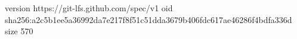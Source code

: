 version https://git-lfs.github.com/spec/v1
oid sha256:a2c5b1ee5a36992da7e217f8f51c51dda3679b406fdc617ae46286f4bdfa336d
size 570
